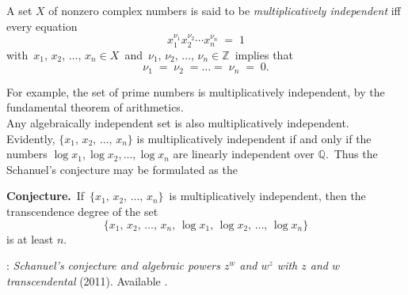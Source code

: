\documentclass[12pt]{article}
\theoremstyle{definition}
\begin{document}
A set $X$ of nonzero complex numbers is said to be {\it multiplicatively independent} iff every equation
$$x_1^{\nu_1}x_2^{\nu_2}\cdots x_n^{\nu_n} \;=\; 1$$
with\, $x_1,\,x_2,\,\ldots,\,x_n \in X$\, and\, $\nu_1,\,\nu_2,\,\ldots,\,\nu_n \in \mathbb{Z}$\, implies that
$$\nu_1 \;=\; \nu_2 \;= \ldots =\; \nu_n \;=\; 0.$$

For example, the set of prime numbers is multiplicatively independent, by the fundamental theorem of arithmetics.\\

Any algebraically independent set is also multiplicatively independent.\\

Evidently, $\{x_1,\,x_2,\,\ldots,\,x_n\}$ is multiplicatively
independent if and only if the numbers $\log x_1$,\,$\log x_2$,\,...,\,$\log x_n$ are linearly independent over $\mathbb{Q}$.\, Thus the Schanuel's conjecture may be formulated as the

\textbf{Conjecture.}\, If\, $\{x_1,\,x_2,\,\ldots,\,x_n\}$\, is multiplicatively independent, then the transcendence degree of the set
$$\{x_1,\,x_2,\,\ldots,\,x_n,\,\log x_1,\,\log x_2,\,\ldots,\,\log x_n\}$$
is at least $n$.

\begin{thebibliography}{8}
: {\it Schanuel's conjecture and algebraic powers $z^w$ and $w^z$ with $z$ and $w$ transcendental} (2011).  Available .
\end{thebibliography}

\end{document}
